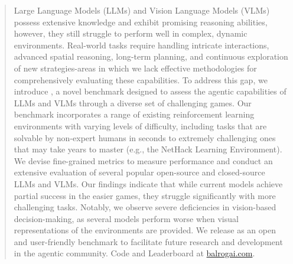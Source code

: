 \begin{abstract}




Large Language Models (LLMs) and Vision Language Models (VLMs) possess extensive knowledge and exhibit promising reasoning abilities, however, they still struggle to perform well in complex, dynamic environments. Real-world tasks require handling intricate interactions, advanced spatial reasoning, long-term planning, and continuous exploration of new strategies-areas in which we lack effective methodologies for comprehensively evaluating these capabilities. To address this gap, we introduce \our{}, a novel benchmark designed to assess the agentic capabilities of LLMs and VLMs through a diverse set of challenging games. Our benchmark incorporates a range of existing reinforcement learning environments with varying levels of difficulty, including tasks that are solvable by non-expert humans in seconds to extremely challenging ones that may take years to master (e.g., the NetHack Learning Environment). 
We devise fine-grained metrics to measure performance and conduct an extensive evaluation of several popular open-source and closed-source LLMs and VLMs. Our findings indicate that while current models achieve partial success in the easier games, they struggle significantly with more challenging tasks. Notably, we observe severe deficiencies in vision-based decision-making, as several models perform worse when visual representations of the environments are provided. We release \our{} as an open and user-friendly benchmark to facilitate future research and development in the agentic community. Code and Leaderboard at \href{https://balrogai.com}{\textcolor{myblue}{balrogai.com}}.



\end{abstract}









